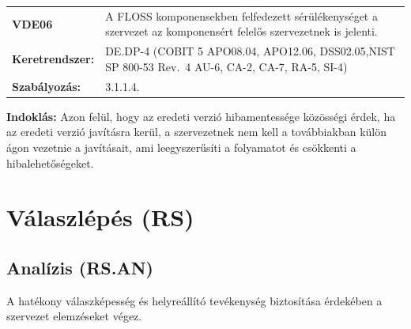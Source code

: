 \documentclass[12pt,magyar,a4paper,oneside]{scrreprt}
\begin{document}
\begin{longtable}[]{@{}ll@{}}
\toprule
\endhead
\begin{minipage}[t]{0.16\columnwidth}\raggedright
\textbf{VDE06}\strut
\end{minipage} & \begin{minipage}[t]{0.79\columnwidth}\raggedright
A FLOSS komponensekben felfedezett sérülékenységet a szervezet az
komponensért felelős szervezetnek is jelenti.\strut
\end{minipage}\tabularnewline
\begin{minipage}[t]{0.16\columnwidth}\raggedright
\textbf{Keretrendszer:}\strut
\end{minipage} & \begin{minipage}[t]{0.79\columnwidth}\raggedright
DE.DP-4 (COBIT 5 APO08.04, APO12.06, DSS02.05,NIST SP 800-53 Rev.~4
AU-6, CA-2, CA-7, RA-5, SI-4)\strut
\end{minipage}\tabularnewline
\begin{minipage}[t]{0.16\columnwidth}\raggedright
\textbf{Szabályozás:}\strut
\end{minipage} & \begin{minipage}[t]{0.79\columnwidth}\raggedright
3.1.1.4.\strut
\end{minipage}\tabularnewline
\bottomrule
\end{longtable}

\textbf{Indoklás: } Azon felül, hogy az eredeti verzió hibamentessége
közösségi érdek, ha az eredeti verzió javításra kerül, a szervezetnek
nem kell a továbbiakban külön ágon vezetnie a javításait, ami
leegyszerűsíti a folyamatot és csökkenti a hibalehetőségeket.

\hypertarget{vuxe1laszluxe9puxe9s-rs}{%
\section{Válaszlépés (RS)}\label{vuxe1laszluxe9puxe9s-rs}}

\hypertarget{analuxedzis-rs.an}{%
\subsection{Analízis (RS.AN)}\label{analuxedzis-rs.an}}

A hatékony válaszképesség és helyreállító tevékenység biztosítása
érdekében a szervezet elemzéseket végez.
\end{document}
